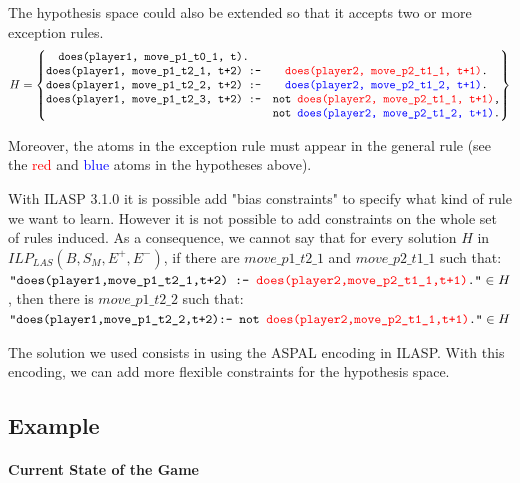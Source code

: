 \documentclass[12pt,twoside]{report}
\begin{document}
\begin{remark}
 The hypothesis space could also be extended so that it accepts two or more  exception rules.
\[H=
\begin{Bmatrix}
\texttt{does(player1, move\_p1\_t0\_1, t).}\\
\texttt{does(player1, move\_p1\_t2\_1, t+2) :-} &\texttt{\textcolor{red}{does(player2, move\_p2\_t1\_1, t+1)}.}\\
\texttt{does(player1, move\_p1\_t2\_2, t+2) :-} &\texttt{\textcolor{blue}{does(player2, move\_p2\_t1\_2, t+1)}.}\\
\texttt{does(player1, move\_p1\_t2\_3, t+2) :-} &\texttt{not \textcolor{red}{does(player2, move\_p2\_t1\_1, t+1)},}\\ &\texttt{not \textcolor{blue}{does(player2, move\_p2\_t1\_2, t+1)}.} 
\end{Bmatrix}
\]
\end{remark}


Moreover, the atoms in the exception rule must appear in the general rule (see the \textcolor{red}{red} and \textcolor{blue}{blue} atoms in the hypotheses above).

\bigskip

With ILASP 3.1.0 it is possible add "bias constraints" to specify what kind of rule we want to learn. However it is not possible to add constraints on the whole set of rules induced. As a consequence, we cannot say that for every solution $H$ in $ILP_{LAS}(B,S_M,E^+,E^-)$, 
if there are $move\_p1\_t2\_1$ and $move\_p2\_t1\_1$ such that:
\\ $\texttt{"does(player1,move\_p1\_t2\_1,t+2) :- \textcolor{red}{does(player2,move\_p2\_t1\_1,t+1)}."}\in H$, 
then there is $move\_p1\_t2\_2$ such that:\\
$\texttt{"does(player1,move\_p1\_t2\_2,t+2):- not \textcolor{red}{does(player2,move\_p2\_t1\_1,t+1)}."}\in H$

\bigskip

The solution we used consists in using the ASPAL encoding in ILASP. With this encoding, we can add more flexible constraints for the hypothesis space.

\subsection{Example}

\paragraph{Current State of the Game}
\end{document}
